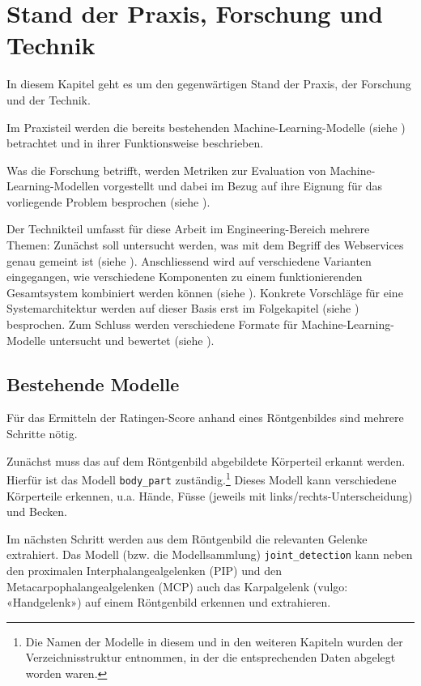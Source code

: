 \section{Stand der Praxis, Forschung und Technik}

In diesem Kapitel geht es um den gegenwärtigen Stand der Praxis, der Forschung und der Technik.

Im Praxisteil werden die bereits bestehenden Machine-Learning-Modelle (siehe ) betrachtet und in ihrer Funktionsweise beschrieben.

Was die Forschung betrifft, werden Metriken zur Evaluation von Machine-Learning-Modellen vorgestellt und dabei im Bezug auf ihre Eignung für das vorliegende Problem besprochen (siehe ).

Der Technikteil umfasst für diese Arbeit im Engineering-Bereich mehrere Themen: Zunächst soll untersucht werden, was mit dem Begriff des Webservices genau gemeint ist (siehe ). Anschliessend wird auf verschiedene Varianten eingegangen, wie verschiedene Komponenten zu einem funktionierenden Gesamtsystem kombiniert werden können (siehe ). Konkrete Vorschläge für eine Systemarchitektur werden auf dieser Basis erst im Folgekapitel (siehe ) besprochen. Zum Schluss werden verschiedene Formate für Machine-Learning-Modelle untersucht und bewertet (siehe ).

\subsection{Bestehende Modelle}
\label{sec:bestehende-modelle}

Für das Ermitteln der Ratingen-Score anhand eines Röntgenbildes sind mehrere Schritte nötig.

Zunächst muss das auf dem Röntgenbild abgebildete Körperteil erkannt werden. Hierfür ist das Modell \texttt{body\_part} zuständig.\footnote{Die Namen der Modelle in diesem und in den weiteren Kapiteln wurden der Verzeichnisstruktur entnommen, in der die entsprechenden Daten abgelegt worden waren.} Dieses Modell kann verschiedene Körperteile erkennen, u.a. Hände, Füsse (jeweils mit links/rechts-Unterscheidung) und Becken.

Im nächsten Schritt werden aus dem Röntgenbild die relevanten Gelenke extrahiert. Das Modell (bzw. die Modellsammlung) \texttt{joint\_detection} kann neben den proximalen Interphalangealgelenken (PIP) und den Metacarpophalangealgelenken (MCP) auch das Karpalgelenk (vulgo: «Handgelenk») auf einem Röntgenbild erkennen und extrahieren.

